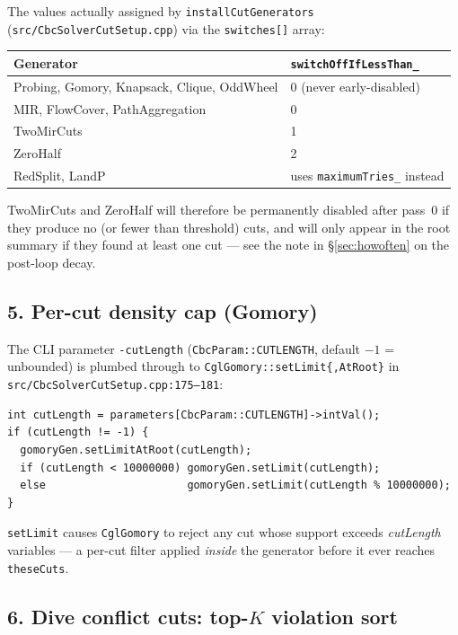 \documentclass[11pt,a4paper]{article}
\begin{document}
The values actually assigned by \texttt{installCutGenerators}
(\texttt{src/CbcSolverCutSetup.cpp}) via the \texttt{switches[]} array:

\begin{tabular}{ll}
\toprule
Generator & \texttt{switchOffIfLessThan\_}\\
\midrule
Probing, Gomory, Knapsack, Clique, OddWheel & 0 (never early-disabled)\\
MIR, FlowCover, PathAggregation             & 0\\
TwoMirCuts                                  & 1\\
ZeroHalf                                    & 2\\
RedSplit, LandP                             & uses \texttt{maximumTries\_} instead\\
\bottomrule
\end{tabular}

TwoMirCuts and ZeroHalf will therefore be permanently disabled after
pass~0 if they produce no (or fewer than threshold) cuts, and will only
appear in the root summary if they found at least one cut --- see the
note in \S\ref{sec:howoften} on the post-loop decay.

\subsection*{5. Per-cut density cap (Gomory)}

The CLI parameter \texttt{-cutLength} (\texttt{CbcParam::CUTLENGTH},
default $-1$ = unbounded) is plumbed through to
\texttt{CglGomory::setLimit\{,AtRoot\}} in
\texttt{src/CbcSolverCutSetup.cpp:175--181}:

\begin{lstlisting}
int cutLength = parameters[CbcParam::CUTLENGTH]->intVal();
if (cutLength != -1) {
  gomoryGen.setLimitAtRoot(cutLength);
  if (cutLength < 10000000) gomoryGen.setLimit(cutLength);
  else                      gomoryGen.setLimit(cutLength % 10000000);
}
\end{lstlisting}

\texttt{setLimit} causes \texttt{CglGomory} to reject any cut whose
support exceeds \emph{cutLength} variables --- a per-cut filter
applied \emph{inside} the generator before it ever reaches
\texttt{theseCuts}.

\subsection*{6. Dive conflict cuts: top-$K$ violation sort}
\end{document}
